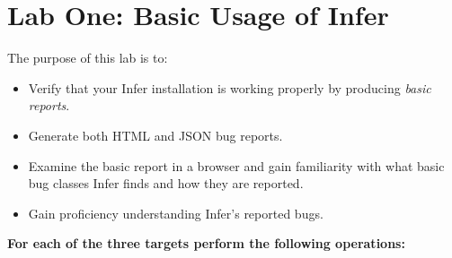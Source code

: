 \section{Lab One: Basic Usage of Infer}

The purpose of this lab is to:
\begin{itemize}
	\itemsep0em
	\item Verify that your Infer installation is working properly by producing \textit{basic reports}.
	\item Generate both HTML and JSON bug reports.
	\item Examine the basic report in a browser and gain familiarity with what basic bug classes 
	Infer finds and how they are reported.
	\item Gain proficiency understanding Infer's reported bugs.
\end{itemize} 


\vspace{0.5cm}

\textbf{For each of the three targets perform the following operations:}

